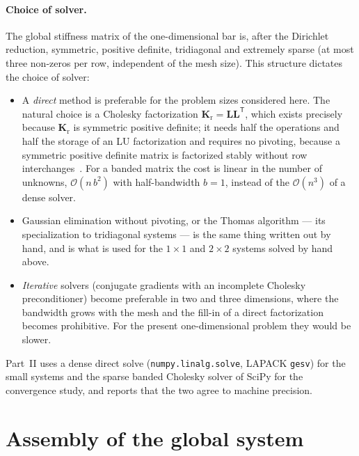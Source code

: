 \documentclass[11pt,a4paper]{article}
\numberwithin{equation}{section}
\theoremstyle{remark}
\newcommand{\bigO}[1]{\mathcal{O}\!\left(#1\right)}
\newcommand{\bK}{\bm{K}}
\begin{document}
\paragraph{Choice of solver.}
The global stiffness matrix of the one-dimensional bar is, after the Dirichlet reduction,
symmetric, positive definite, tridiagonal and extremely sparse (at most three non-zeros per
row, independent of the mesh size). This structure dictates the choice of solver:
\begin{itemize}\setlength{\itemsep}{1pt}
  \item A \emph{direct} method is preferable for the problem sizes considered here. The
    natural choice is a Cholesky factorization $\bK_{\mathrm{r}} = \bm{L}\bm{L}^{\mathsf{T}}$,
    which exists precisely because $\bK_{\mathrm{r}}$ is symmetric positive definite; it
    needs half the operations and half the storage of an LU factorization and requires no
    pivoting, because a symmetric positive definite matrix is factorized stably without
    row interchanges~\citep{golub2013}. For a banded matrix the cost is linear in the number
    of unknowns, $\bigO{n\,b^2}$ with half-bandwidth $b = 1$, instead of the
    $\bigO{n^3}$ of a dense solver.
  \item Gaussian elimination without pivoting, or the Thomas algorithm --- its
    specialization to tridiagonal systems --- is the same thing written out by hand, and is
    what is used for the $1\times1$ and $2\times2$ systems solved by hand above.
  \item \emph{Iterative} solvers (conjugate gradients with an incomplete Cholesky
    preconditioner) become preferable in two and three dimensions, where the bandwidth
    grows with the mesh and the fill-in of a direct factorization becomes prohibitive. For
    the present one-dimensional problem they would be slower.
\end{itemize}
Part~II uses a dense direct solve (\texttt{numpy.linalg.solve}, LAPACK \texttt{gesv}) for
the small systems and the sparse banded Cholesky solver of SciPy for the convergence study,
and reports that the two agree to machine precision.

\section{Assembly of the global system}\label{sec:assembly}
\end{document}
